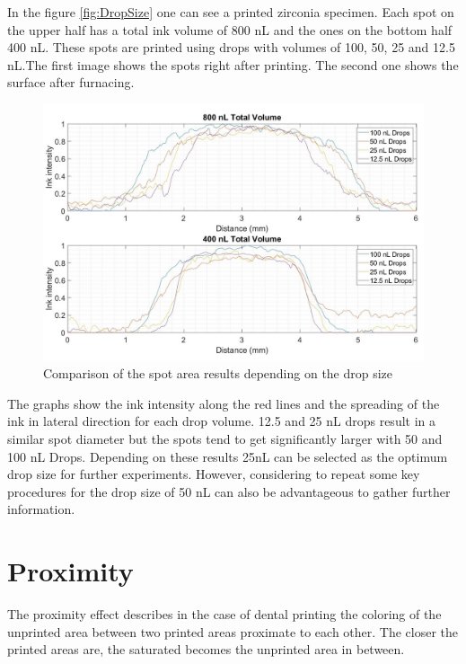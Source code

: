 In the figure \ref{fig:DropSize} one can see a printed zirconia specimen. Each spot on the upper half has a total ink volume of 800 nL and the ones on the bottom half 400 nL. These spots are printed using drops with volumes of 100, 50, 25 and 12.5 nL.The first image shows the spots right after printing. The second one shows the surface after furnacing.

\bigskip

\begin{figure}[H]
	\centering
	\includegraphics[width=1\textwidth]{grafiken/SpotArea.jpg}
	\caption{Comparison of the spot area results depending on the drop size}
	\label{fig:SpotArea}
\end{figure} 

\bigskip

The graphs show the ink intensity along the red lines and the spreading of the ink in lateral direction for each drop volume. 12.5 and 25 nL drops result in a similar spot diameter but the spots tend to get significantly larger with 50 and 100 nL Drops. Depending on these results 25nL can be selected as the optimum drop size for further experiments. However, considering to repeat some key procedures for the drop size of 50 nL can also be advantageous to gather further information.

\section{Proximity}

The proximity effect describes in the case of dental printing the coloring of the unprinted area between two printed areas proximate to each other. The closer the printed areas are, the saturated becomes the unprinted area in between.

